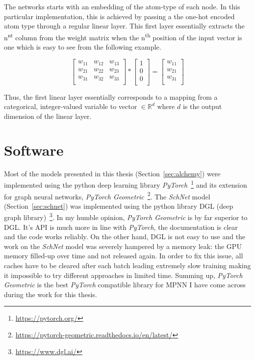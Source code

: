 The networks starts with an embedding of the atom-type of each node. In this particular implementation, this is achieved by passing a the one-hot encoded atom type through a regular linear layer. This first layer essentially extracts the n\textsuperscript{nt} column from the weight matrix when the n\textsuperscript{th} position of the input vector is one which is easy to see from the following example.

\begin{equation}
\begin{bmatrix} 
w_{11} & w_{12} & w_{13} \\
w_{21} & w_{22} & w_{23} \\
w_{31} & w_{32} & w_{33} \\
\end{bmatrix}
*
\begin{bmatrix} 
1 \\
0 \\
0 \\
\end{bmatrix}
=
\begin{bmatrix} 
w_{11} \\
w_{21} \\
w_{31} \\
\end{bmatrix}
\end{equation}

Thus, the first linear layer essentially corresponds to a mapping from a categorical, integer-valued variable to vector $\in \mathbb{R}^d$ where $d$ is the output dimension of the linear layer.
            


\section{Software}

Most of the models presented in this thesis (Section~\ref{sec:alchemy}) were implemented using the python deep learning library \textit{PyTorch}~\footnote{\url{https://pytorch.org/}} and its extension for graph neural networks, \textit{PyTorch Geometric}~\footnote{\url{https://pytorch-geometric.readthedocs.io/en/latest/}}. The \textit{SchNet} model (Section~\ref{sec:schnet}) was implemented using the python library DGL (deep graph library)~\footnote{\url{https://www.dgl.ai/}}. In my humble opinion, \textit{PyTorch Geometric} is by far superior to DGL. It's API is much more in line with \textit{PyTorch}, the documentation is clear and the code works reliably. On the other hand, DGL is not easy to use and the work on the \textit{SchNet} model was severely hampered by a memory leak: the GPU memory filled-up over time and not released again. In order to fix this issue, all caches have to be cleared after each batch leading extremely slow training making it impossible to try different approaches in limited time. Summing up, \textit{PyTorch Geometric} is the best \textit{PyTorch} compatible library for MPNN I have come across during the work for this thesis.

